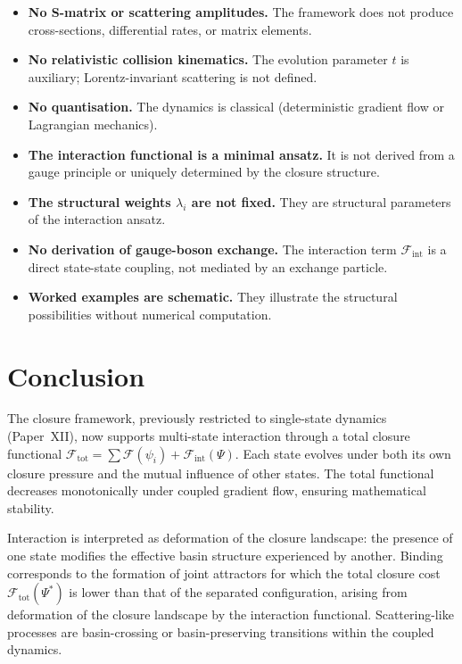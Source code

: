 \documentclass[12pt]{article}
\newcommand{\Fcal}{\mathcal{F}}
\newcommand{\Fint}{\Fcal_{\mathrm{int}}}
\newcommand{\Ftot}{\Fcal_{\mathrm{tot}}}
\begin{document}
\begin{itemize}
    \item \textbf{No S-matrix or scattering amplitudes.} The framework does not produce cross-sections, differential rates, or matrix elements.
    \item \textbf{No relativistic collision kinematics.} The evolution parameter $t$ is auxiliary; Lorentz-invariant scattering is not defined.
    \item \textbf{No quantisation.} The dynamics is classical (deterministic gradient flow or Lagrangian mechanics).
    \item \textbf{The interaction functional is a minimal ansatz.} It is not derived from a gauge principle or uniquely determined by the closure structure.
    \item \textbf{The structural weights $\lambda_i$ are not fixed.} They are structural parameters of the interaction ansatz.
    \item \textbf{No derivation of gauge-boson exchange.} The interaction term $\Fint$ is a direct state-state coupling, not mediated by an exchange particle.
    \item \textbf{Worked examples are schematic.} They illustrate the structural possibilities without numerical computation.
\end{itemize}

\section{Conclusion}\label{sec:conclusion}

The closure framework, previously restricted to single-state dynamics (Paper~XII), now supports multi-state interaction through a total closure functional $\Ftot = \sum\Fcal(\psi_i) + \Fint(\Psi)$. Each state evolves under both its own closure pressure and the mutual influence of other states. The total functional decreases monotonically under coupled gradient flow, ensuring mathematical stability.

Interaction is interpreted as deformation of the closure landscape: the presence of one state modifies the effective basin structure experienced by another. Binding corresponds to the formation of joint attractors for which the total closure cost $\Ftot(\Psi^*)$ is lower than that of the separated configuration, arising from deformation of the closure landscape by the interaction functional. Scattering-like processes are basin-crossing or basin-preserving transitions within the coupled dynamics.
\end{document}

